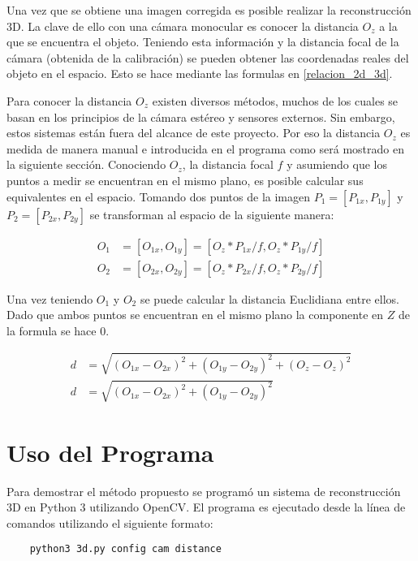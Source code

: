 \documentclass[]{article}
\begin{document}
Una vez que se obtiene una imagen corregida es posible realizar la reconstrucción 3D. La clave de ello con una cámara monocular es conocer la distancia $O_z$ a la que se encuentra el objeto. Teniendo esta información y la distancia focal de la cámara (obtenida de la calibración) se pueden obtener las coordenadas reales del objeto en el espacio. Esto se hace mediante las formulas en \ref{relacion_2d_3d}.

Para conocer la distancia $O_z$ existen diversos métodos, muchos de los cuales se basan en los principios de la cámara estéreo y sensores externos. Sin embargo, estos sistemas están fuera del alcance de este proyecto. Por eso la distancia $O_z$ es medida de manera manual e introducida en el programa como será mostrado en la siguiente sección. Conociendo $O_z$, la distancia focal $f$ y asumiendo que los puntos a medir se encuentran en el mismo plano, es posible calcular sus equivalentes en el espacio. Tomando dos puntos de la imagen $P_1 = [P_{1x}, P_{1y}]$ y $P_2 = [P_{2x}, P_{2y}]$ se transforman al espacio de la siguiente manera:

\begin{align}
	O_1 &= [O_{1x}, O_{1y}] = [O_z * P_{1x} / f, O_z * P_{1y} / f]\\
	O_2 &= [O_{2x}, O_{2y}] = [O_z * P_{2x} / f, O_z * P_{2y} / f]
\end{align}

Una vez teniendo $O_1$ y $O_2$ se puede calcular la distancia Euclidiana entre ellos. Dado que ambos puntos se encuentran en el mismo plano la componente en $Z$ de la formula se hace $0$.

\begin{align}
	d &= \sqrt{(O_{1x} - O_{2x})^2 + (O_{1y} - O_{2y})^2 + (O_{z} - O_{z})^2}\\
	d &= \sqrt{(O_{1x} - O_{2x})^2 + (O_{1y} - O_{2y})^2} 
\end{align}

\section{Uso del Programa}

Para demostrar el método propuesto se programó un sistema de reconstrucción 3D en Python 3 utilizando OpenCV. El programa es ejecutado desde la línea de comandos utilizando el siguiente formato:

\begin{verbatim}
	python3 3d.py config cam distance
\end{verbatim}
\end{document}
